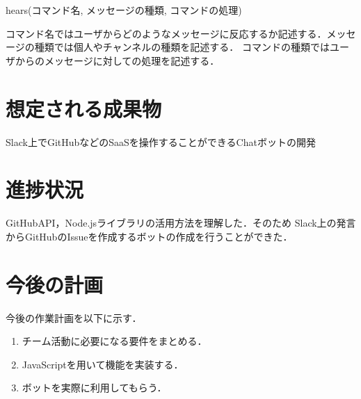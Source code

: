 \documentclass[uplatex,twocolumn,dvipdfmx]{jsarticle}
\begin{document}
hears(コマンド名, メッセージの種類, コマンドの処理)

コマンド名ではユーザからどのようなメッセージに反応するか記述する．メッセージの種類では個人やチャンネルの種類を記述する．
コマンドの種類ではユーザからのメッセージに対しての処理を記述する．






\section{想定される成果物}
Slack上でGitHubなどのSaaSを操作することができるChatボットの開発

\section{進捗状況}
GitHubAPI，Node.jsライブラリの活用方法を理解した．そのため
Slack上の発言からGitHubのIssueを作成するボットの作成を行うことができた．




\section{今後の計画}
今後の作業計画を以下に示す．
\begin{enumerate}
\item チーム活動に必要になる要件をまとめる．
\item JavaScriptを用いて機能を実装する．
\item ボットを実際に利用してもらう．
\end{enumerate}




\end{document}
